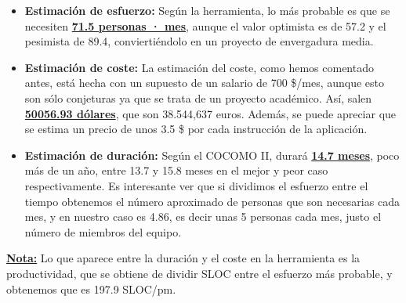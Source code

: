\documentclass[spanish,a4paper,11pt, twoside]{report}	%
\begin{document}
\vspace{0.35cm}
\hspace{-3.2cm}
\vspace{0.35cm}

\begin{itemize}
	\item{\bfseries{Estimación de esfuerzo:}}
	Según la herramienta, lo más probable es que se necesiten \textbf{\underline{71.5 personas · mes}}, aunque el valor optimista es de 57.2 y el pesimista de 89.4, conviertiéndolo en un proyecto de envergadura media.
	\item{\bfseries{Estimación de coste:}}
	La estimación del coste, como hemos comentado antes, está hecha con un supuesto de un salario de 700 \$/mes, aunque esto son sólo conjeturas ya que se trata de un proyecto académico. Así, salen \textbf{\underline{50056.93 dólares}}, que son 38.544,637 euros. Además, se puede apreciar que se estima un precio de unos 3.5 \$ por cada instrucción de la aplicación.
	\item{\bfseries{Estimación de duración:}}
	Según el COCOMO II, durará \textbf{\underline{14.7 meses}}, poco más de un año, entre 13.7 y 15.8 meses en el mejor y peor caso respectivamente. Es interesante ver que si dividimos el esfuerzo entre el tiempo obtenemos el número aproximado de personas que son necesarias cada mes, y en nuestro caso es 4.86, es decir unas 5 personas cada mes, justo el número de miembros del equipo.
\end{itemize}

\textbf{\underline{Nota:}} Lo que aparece entre la duración y el coste en la herramienta es la productividad, que se obtiene de dividir SLOC entre el esfuerzo más probable, y obtenemos que es 197.9 SLOC/pm.

\newpage
\mbox{}
\thispagestyle{empty}						%
\newpage
\end{document}
